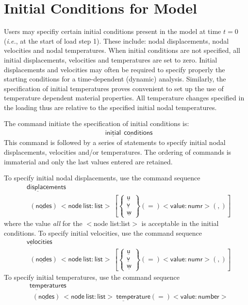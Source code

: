 \documentclass[11pt]{report}
\numberwithin{equation}{section}
\newcommand{\nin} {\noindent}
\newcommand{\ul} {\underline}
\newcommand{\hv} {\mathsf}   %
\newcommand{\ie}{\emph{i.e.},\xspace}
\newcommand{\ti}{\emph}
\begin{document}
\section{Initial Conditions for Model}

Users may specifiy certain initial conditions present in the model at time $t=0$ (\ie at the start 
of load step 1). These include: nodal displacements, nodal velocities and nodal temperatures. 
When initial conditions are not specified, all initial displacements, velocities and 
temperatures are set to zero. Initial displacements and velocities may often be 
required to specify properly the starting conditions for a time-dependent (dynamic) 
analysis. Similarly, the specification of initial temperatures proves convenient to 
set up the use of temperature dependent material properties. All temperature 
changes specified in the loading thus are relative to the specified initial nodal 
temperatures.

The command initiate the specification of initial conditions is:
\begin{align*}
& \hv{\ul{initial}}\ \ \hv{\ul{cond}itions}
\end{align*}
\nin This command is followed by a series of statements to specify initial nodal displacements, 
velocities and/or temperatures. The ordering of commands is immaterial and 
only the last values entered are retained.

To specify initial nodal displacements, use the command sequence
\begin{align*}
& \hv{\ul{displace}ments} \\
&\ \ \hv{(\ul{node}s)\ <node\ list:list>}\ \left [
\begin{Bmatrix}
\hv{  \ul{u}} \\ \hv{\ul{v}}  \\ \hv{\ul{w}} 
\end{Bmatrix}
\hv{(=)<value:numr>}(,) \right ]
\end{align*}
\nin where the value \ti{all} for the $<$node list:list$>$ is acceptable 
in the initial conditions. To specify initial velocities, use the command sequence 
\begin{align*}
& \hv{\ul{vel}ocities} \\
&\ \ \hv{(\ul{node}s)\ <node\ list:list>}\ \left [
\begin{Bmatrix}
\hv{  \ul{u}} \\ \hv{\ul{v}}  \\ \hv{\ul{w}} 
\end{Bmatrix}
\hv{(=)<value:numr>}(,) \right ]
\end{align*}
To specify initial temperatures, use the command sequence 
\begin{align*}
& \hv{\ul{temp}eratures} \\
&\ \ \hv{(\ul{node}s)\ <node\ list:list>}\ \hv{\ul{temp}erature (=) <value:number>}
\end{align*}
\end{document}
